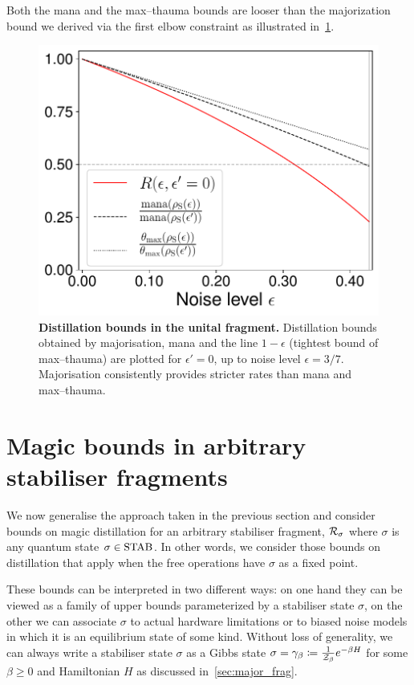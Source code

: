 \documentclass[pra,
aps,
twocolumn,
superscriptaddress,
groupedaddress,
nofootinbib,
reprint
]{revtex4-1}
\begin{document}
Both the mana and the max--thauma bounds are looser than the majorization bound we derived via the first elbow constraint as illustrated in~\cref{fig:distill_bounds}.
\begin{figure}[t]
    \centering
    \includegraphics[scale=0.45]{figs/distill_bounds.pdf}
    \caption{\textbf{Distillation bounds in the unital fragment.} Distillation bounds obtained by majorisation, mana and the line $1-\epsilon$ (tightest bound of max--thauma) are plotted for $\epsilon' = 0$, up to noise level $\epsilon = 3/7$.
    Majorisation consistently provides stricter rates than mana and max--thauma.
    }
    \label{fig:distill_bounds}
\end{figure}

\section{Magic bounds in arbitrary stabiliser fragments}
\label{sec:stab}

We now generalise the approach taken in the previous section and consider bounds on magic distillation for an arbitrary stabiliser fragment, $\mathcal{R}_\sigma$ where $\sigma$ is any quantum state $\sigma \in {\rm{STAB}}$.
In other words, we consider those bounds on distillation that apply when the free operations have $\sigma$ as a fixed point.

These bounds can be interpreted in two different ways: on one hand they can be viewed as a family of upper bounds parameterized by a stabiliser state $\sigma$, on the other we can associate $\sigma$ to actual hardware limitations or to biased noise models in which it is an equilibrium state of some kind. 
Without loss of generality, we can always write a stabiliser state $\sigma$ as a Gibbs state $\sigma = \gamma_\beta \coloneqq \frac{1}{\mathcal{Z}_\beta} e^{-\beta H}$ for some $\beta \geq 0$ and Hamiltonian $H$ as discussed in~\cref{sec:major_frag}.
\end{document}
